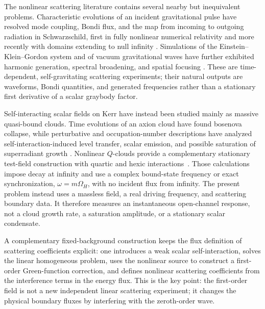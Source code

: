 \documentclass[aps,prd,twocolumn,10pt,nofootinbib,superscriptaddress,floatfix]{revtex4-2}
\begin{document}
The nonlinear scattering literature contains several nearby but inequivalent
problems.  Characteristic evolutions of an incident gravitational pulse have
resolved mode coupling, Bondi flux, and the map from incoming to outgoing
radiation in Schwarzschild, first in fully nonlinear numerical relativity and
more recently with domains extending to null infinity
\cite{Zlochower2003,Frauendiener2021,Frauendiener2025}.  Simulations of the
Einstein--Klein--Gordon system and of vacuum gravitational waves have further
exhibited harmonic generation, spectral broadening, and spatial focusing
\cite{Cardoso2026}.  These are time-dependent, self-gravitating scattering
experiments; their natural outputs are waveforms, Bondi quantities, and
generated frequencies rather than a stationary first derivative of a scalar
graybody factor.

Self-interacting scalar fields on Kerr have instead been studied mainly as
massive quasi-bound clouds.  Time evolutions of an axion cloud have found
bosenova collapse, while perturbative and occupation-number descriptions have
analyzed self-interaction-induced level transfer, scalar emission, and possible
saturation of superradiant growth
\cite{YoshinoKodama2012,FukudaNakayama2020,Omiya2021,Baryakhtar2021,
XieHuang2025}.  Nonlinear $Q$-clouds provide a complementary stationary test-field
construction with quartic and hexic interactions~\cite{HerdeiroQCloud2014}.
Those calculations impose decay at infinity and use a complex bound-state
frequency or exact synchronization, $\omega=m\Omega_H$, with no incident flux
from infinity.  The present problem instead uses a massless field, a real
driving frequency, and scattering boundary data.  It therefore measures an
instantaneous open-channel response, not a cloud growth rate, a saturation
amplitude, or a stationary scalar condensate.

A complementary fixed-background construction keeps the flux definition of
scattering coefficients explicit: one introduces a weak scalar
self-interaction, solves the linear homogeneous problem, uses the nonlinear
source to construct a first-order Green-function correction, and defines
nonlinear scattering coefficients from the interference terms in the energy
flux.  This is the key point: the first-order field is not a new independent
linear scattering experiment; it changes the physical boundary fluxes by
interfering with the zeroth-order wave.
\end{document}
